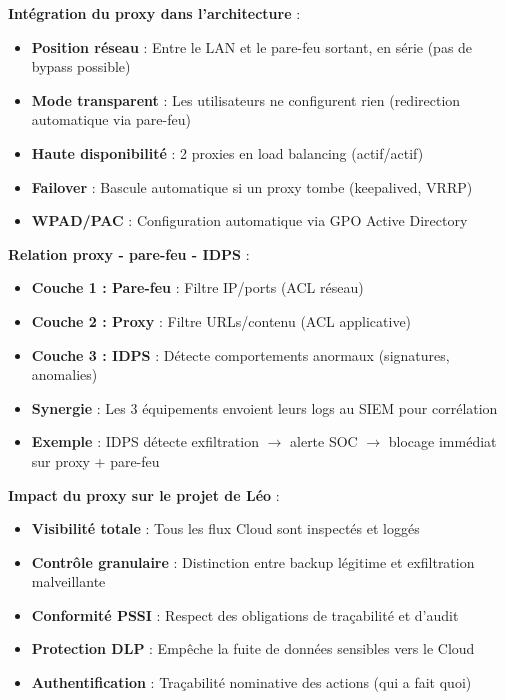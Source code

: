 \medskip

\noindent \textbf{Intégration du proxy dans l'architecture} :

\begin{itemize}
  \item \textbf{Position réseau} : Entre le LAN et le pare-feu sortant, en série (pas de bypass possible)
  \item \textbf{Mode transparent} : Les utilisateurs ne configurent rien (redirection automatique via pare-feu)
  \item \textbf{Haute disponibilité} : 2 proxies en load balancing (actif/actif)
  \item \textbf{Failover} : Bascule automatique si un proxy tombe (keepalived, VRRP)
  \item \textbf{WPAD/PAC} : Configuration automatique via GPO Active Directory
\end{itemize}

\medskip

\noindent \textbf{Relation proxy - pare-feu - IDPS} :

\begin{itemize}
  \item \textbf{Couche 1 : Pare-feu} : Filtre IP/ports (ACL réseau)
  \item \textbf{Couche 2 : Proxy} : Filtre URLs/contenu (ACL applicative)
  \item \textbf{Couche 3 : IDPS} : Détecte comportements anormaux (signatures, anomalies)
  \item \textbf{Synergie} : Les 3 équipements envoient leurs logs au SIEM pour corrélation
  \item \textbf{Exemple} : IDPS détecte exfiltration $\rightarrow$ alerte SOC $\rightarrow$ blocage immédiat sur proxy + pare-feu
\end{itemize}

\medskip

\noindent \textbf{Impact du proxy sur le projet de Léo} :

\begin{itemize}
  \item \textbf{Visibilité totale} : Tous les flux Cloud sont inspectés et loggés
  \item \textbf{Contrôle granulaire} : Distinction entre backup légitime et exfiltration malveillante
  \item \textbf{Conformité PSSI} : Respect des obligations de traçabilité et d'audit
  \item \textbf{Protection DLP} : Empêche la fuite de données sensibles vers le Cloud
  \item \textbf{Authentification} : Traçabilité nominative des actions (qui a fait quoi)
\end{itemize}

